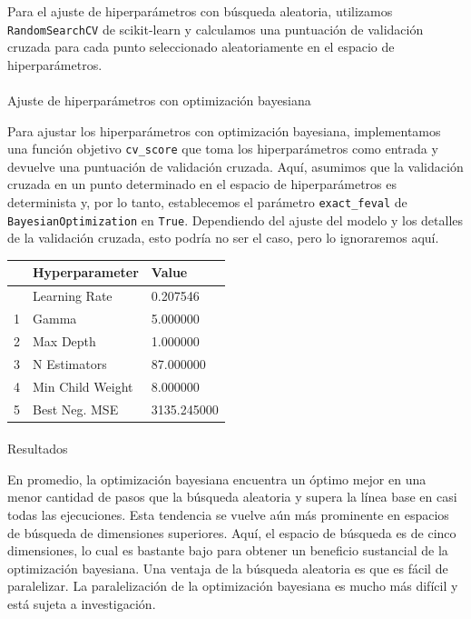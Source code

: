 \documentclass[
  12pt,
  letterpaper,
  DIV=11,
  numbers=noendperiod]{scrartcl}
\makeatletter
\let\oldparagraph\paragraph
\renewcommand{\paragraph}{
    \@ifstar
      \xxxParagraphStar
      \xxxParagraphNoStar
  }
\newcommand{\xxxParagraphStar}[1]{\oldparagraph*{#1}\mbox{}}
\newcommand{\xxxParagraphNoStar}[1]{\oldparagraph{#1}\mbox{}}
\makeatother
\begin{document}
Para el ajuste de hiperparámetros con búsqueda aleatoria, utilizamos
\texttt{RandomSearchCV} de scikit-learn y calculamos una puntuación de
validación cruzada para cada punto seleccionado aleatoriamente en el
espacio de hiperparámetros.

\paragraph{Ajuste de hiperparámetros con optimización
bayesiana}\label{ajuste-de-hiperparuxe1metros-con-optimizaciuxf3n-bayesiana}

Para ajustar los hiperparámetros con optimización bayesiana,
implementamos una función objetivo \texttt{cv\_score} que toma los
hiperparámetros como entrada y devuelve una puntuación de validación
cruzada. Aquí, asumimos que la validación cruzada en un punto
determinado en el espacio de hiperparámetros es determinista y, por lo
tanto, establecemos el parámetro \texttt{exact\_feval} de
\texttt{BayesianOptimization} en \texttt{True}. Dependiendo del ajuste
del modelo y los detalles de la validación cruzada, esto podría no ser
el caso, pero lo ignoraremos aquí.

\begin{longtable}[]{@{}lll@{}}
\toprule\noalign{}
& Hyperparameter & Value \\
\midrule\noalign{}
\endhead
\bottomrule\noalign{}
\endlastfoot
0 & Learning Rate & 0.207546 \\
1 & Gamma & 5.000000 \\
2 & Max Depth & 1.000000 \\
3 & N Estimators & 87.000000 \\
4 & Min Child Weight & 8.000000 \\
5 & Best Neg. MSE & 3135.245000 \\
\end{longtable}

\paragraph{Resultados}\label{resultados}

En promedio, la optimización bayesiana encuentra un óptimo mejor en una
menor cantidad de pasos que la búsqueda aleatoria y supera la línea base
en casi todas las ejecuciones. Esta tendencia se vuelve aún más
prominente en espacios de búsqueda de dimensiones superiores. Aquí, el
espacio de búsqueda es de cinco dimensiones, lo cual es bastante bajo
para obtener un beneficio sustancial de la optimización bayesiana. Una
ventaja de la búsqueda aleatoria es que es fácil de paralelizar. La
paralelización de la optimización bayesiana es mucho más difícil y está
sujeta a investigación.
\end{document}
